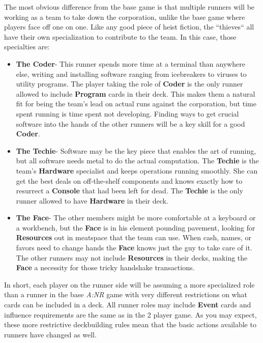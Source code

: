 \documentclass[titlepage]{article}
\begin{document}
The most obvious difference from the base game is that multiple runners will be working as a team to take down the corporation, unlike the base game where players face off one on one. Like any good piece of heist fiction, the ``thieves`` all have their own specialization to contribute to the team. In this case, those specialties are:
\begin{itemize}
	\item \textbf{The Coder}-
		This runner spends more time at a terminal than anywhere else, writing and installing software ranging from icebreakers to viruses to utility programs. The player taking the role of \textbf{Coder} is the only runner allowed to include \textbf{Program} cards in their deck. This makes them a natural fit for being the team's lead on actual runs against the corporation, but time spent running is time spent not developing. Finding ways to get crucial software into the hands of the other runners will be a key skill for a good \textbf{Coder}.
	\item \textbf{The Techie}-
		Software may be the key piece that enables the art of running, but all software needs metal to do the actual computation. The \textbf{Techie} is the team's \textbf{Hardware} specialist and keeps operations running smoothly. She can get the best deals on off-the-shelf components and knows exactly how to resurrect a \textbf{Console} that had been left for dead. The \textbf{Techie} is the only runner allowed to have \textbf{Hardware} in their deck.
	\item \textbf{The Face}-
		The other members might be more comfortable at a keyboard or a workbench, but the \textbf{Face} is in his element pounding pavement, looking for \textbf{Resources} out in meatspace that the team can use. When cash, names, or favors need to change hands the \textbf{Face} knows just the guy to take care of it. The other runners may not include \textbf{Resources} in their decks, making the \textbf{Face} a necessity for those tricky handshake transactions.

\end{itemize}

In short, each player on the runner side will be assuming a more specialized role than a runner in the base \emph{A:NR} game with very different restrictions on what cards can be included in a deck. All runner roles may include \textbf{Event} cards and influence requirements are the same as in the 2 player game. As you may expect, these more restrictive deckbuilding rules mean that the basic actions available to runners have changed as well.
\end{document}

